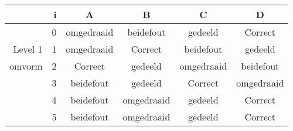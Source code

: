 \begin{tabular}{ rr| c|c|c|c}\hline\hline
     & i & \textbf{A} & \textbf{B} & \textbf{C} & \textbf{D}\\\hline

&0&omgedraaid&beidefout&gedeeld&Correct\cellcolor[gray]{0.6}\\
Level 1 & 1&omgedraaid&Correct\cellcolor[gray]{0.6}&beidefout&gedeeld\\
omvorm &2&Correct\cellcolor[gray]{0.6}&gedeeld&omgedraaid&beidefout\\
&3&beidefout&gedeeld&Correct\cellcolor[gray]{0.6}&omgedraaid\\
&4&beidefout&omgedraaid&gedeeld&Correct\cellcolor[gray]{0.6}\\
&5&beidefout&omgedraaid&gedeeld&Correct\cellcolor[gray]{0.6}\\
\hline\end{tabular}\par\ \newline

